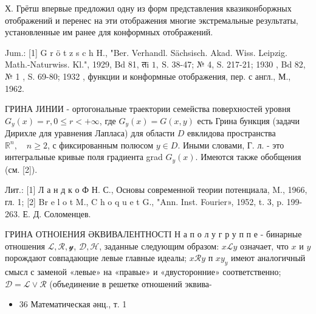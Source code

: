 \documentclass[10pt]{article}
\begin{document}
Х. Грётш впервые предложил одну из форм представления квазиконборжных отображений и перенес на эти отображения многие экстремальные результаты, установленные им ранее для конформных отображений.



Jum.: [1] G r ö t z s c h H., "Ber. Verhandl. Sächsisch. Akad. Wiss. Leipzig. Math.-Naturwiss. Kl.", 1929, Bd 81, तi $1, \mathrm{~S}$. 38-47; № 4, S. 217-21; 1930 , Bd 82, № 1 , S. 69-80; 1932 , функции и конформные отображения, пер. с англ., М., 1962.



ГРИНА ЈИНИИ - ортогональные траектории семейства поверхностей уровня $G_{y}(x)=r, 0 \leqslant r<+\infty$, где $G_{y}(x)=G(x, y)$ есть Грина бункция (задачи Дирихле для уравнения Лапласа) для области $D$ евклидова пространства $\mathbb{R}^{n}, \quad n \geqslant 2$, с фиксированным полюсом $y \in D$. Иными словами, Г. л. - это интегральные кривые поля градиента grad $G_{y}(x)$. Имеются также обобщения (см. [2]).



Лит.: [1] Л а н д к о Ф Н. С., Основы современной теории потенциала, M., 1966, гл. 1; [2] Br e l o t M., C h o q u e t G., "Ann. Inst. Fourier», 1952, t. 3, p. 199-263. Е. Д. Соломенцев.



ГРИНА ОТНОІЕНИЯ ӘКВИВАЛЕНТНОСТІ Н а п о л у г р у п п е - бинарные отношения $\mathscr{L}, \mathscr{R}, \mathcal{y}$, $\mathscr{D}, \mathscr{H}$, заданные следующим образом: $x \mathscr{L} y$ означает, что $x$ и $y$ порождают совпадающие левые главные идеалы; $x \mathscr{R} y$ п $x y_{y}$ имеют аналогичный смысл с заменой «левые» на «правые» и «двусторонние» соответственно; $\mathscr{D}=\mathscr{L} \vee \mathscr{R}$ (объединение в решетке отношений эквива-



\begin{itemize}

  \item 36 Математическая әнц., т. 1

\end{itemize}
\end{document}
